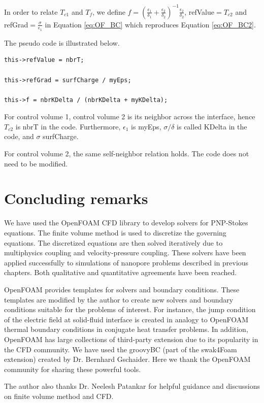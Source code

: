 In order to relate $T_{c1}$ and $T_f$, we define $f = \left(\frac{\epsilon_1}{\delta_1}+\frac{\epsilon_2}{\delta_2}\right)^{-1}\frac{\epsilon_2}{\delta_2}$, \textsf{refValue}$=T_{c2}$ and \textsf{refGrad}$=\frac{\sigma}{\epsilon_1}$ in Equation \ref{eq:OF_BC} which reproduces Equation \ref{eq:OF_BC2}. 

The pseudo code is illustrated below.

\begin{lstlisting}
this->refValue = nbrT;

this->refGrad = surfCharge / myEps;

this->f = nbrKDelta / (nbrKDelta + myKDelta);
\end{lstlisting}
For control volume 1, control volume 2 is its neighbor across the interface, hence $T_{c2}$ is \textsf{nbrT} in the code. 
Furthermore, $\epsilon_1$ is \textsf{myEps}, $\sigma/\delta$ is called \textsf{KDelta} in the code, and $\sigma$ \textsf{surfCharge}.

For control volume 2, the same self-neighbor relation holds. The code does not need to be modified.

\section{Concluding remarks}
We have used the OpenFOAM CFD library to develop solvers for PNP-Stokes equations. The finite volume method is used to discretize the governing equations. The discretized equations are then solved iteratively due to multiphysics coupling and velocity-pressure coupling. These solvers have been applied successfully to simulations of nanopore problems described in previous chapters. Both qualitative and quantitative agreements have been reached.

OpenFOAM provides templates for solvers and boundary conditions. These templates are modified by the author to create new solvers and boundary conditions suitable for the problems of interest. For instance, the jump condition of the electric field at solid-fluid interface is created in analogy to OpenFOAM thermal boundary conditions in conjugate heat transfer problems. In addition, OpenFOAM has large collections of third-party extension due to its popularity in the CFD community. We have used the \textsf{groovyBC} (part of the \textsf{swak4Foam} extension) created by Dr. Bernhard Gschaider. Here we thank the OpenFOAM community for sharing these powerful tools. 

The author also thanks Dr. Neelesh Patankar for helpful guidance and discussions on finite volume method and CFD.
